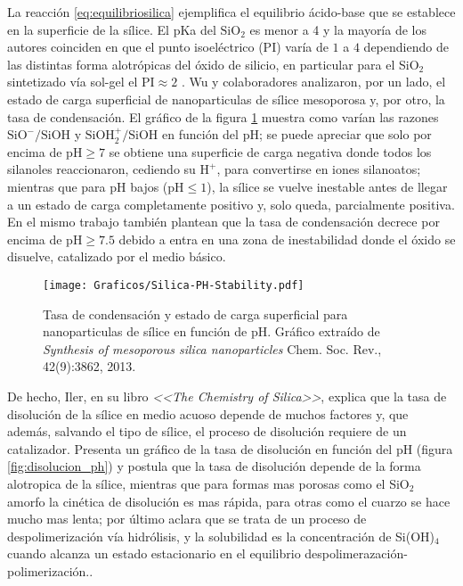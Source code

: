 	La reacción \ref{eq:equilibriosilica} ejemplifica el equilibrio ácido-base que se establece en la superficie de la sílice. El pKa del $\text{SiO}_2$ es menor a 4 y la mayoría de los autores coinciden en que el punto isoeléctrico (PI) varía de $1$ a $4$ dependiendo de  las distintas forma alotrópicas del óxido de silicio, en particular para el SiO$_2$ sintetizado vía sol-gel el $\text{PI}\approx 2$ \cite{Kosmulski2002,Kosmulski2014,Schwarz1984,Si-HanWu2013}.
	Wu y colaboradores\cite{Si-HanWu2013} analizaron, por un lado, el estado de carga superficial de nanoparticulas de sílice mesoporosa y, por otro, la tasa de condensación. El gráfico de la figura \ref{fig:silica_ph} muestra como varían las razones  $\text{SiO}^{-}/\text{SiOH}$ y $\text{SiOH}_2^{+}/\text{SiOH}$ en función del pH; se puede apreciar que solo por encima de $\text{pH}\geq7$ se obtiene una superficie de carga negativa donde todos los silanoles reaccionaron, cediendo su $\text{H}^{+}$, para convertirse en iones silanoatos; mientras que para pH bajos ($\text{pH}\leq1$), la sílice se vuelve inestable antes de llegar a un estado de carga completamente positivo y, solo queda, parcialmente positiva. En el mismo trabajo\cite{Si-HanWu2013} también plantean que la tasa de condensación decrece por encima de $\text{pH}\geq7.5$ debido a entra en una zona de inestabilidad donde el óxido se disuelve, catalizado por el medio básico.
			\begin{figure}[th!]
			\centering
 	       	\texttt{[image: Graficos/Silica-PH-Stability.pdf]}
	       		\caption[Tasa de condensación y estado de carga superficial]{Tasa de condensación y estado de carga superficial para nanoparticulas de sílice en función de pH. Gráfico extraído de \textit{Synthesis of mesoporous silica nanoparticles} Chem. Soc. Rev., 42(9):3862, 2013.\cite{Si-HanWu2013}}
	         	\label{fig:silica_ph}
	     		\end{figure}
			
	De hecho, Iler, en su libro \textit{<<The Chemistry of Silica>>}, explica que la tasa de disolución de la sílice en medio acuoso depende de muchos factores y, que además, salvando el tipo de sílice, el proceso de disolución requiere de un catalizador. Presenta un gráfico de la tasa de disolución en función del pH (figura \ref{fig:disolucion_ph}) y postula que la tasa de disolución depende de la forma alotropica de la sílice, mientras que para formas mas porosas como el SiO$_2$ amorfo la cinética de disolución es mas rápida, para otras como el cuarzo se hace mucho mas lenta; por último aclara que se trata de un proceso de despolimerización vía hidrólisis, y la solubilidad es la concentración de Si(OH)$_4$ cuando alcanza un estado estacionario en el equilibrio despolimerazación-polimerización.\cite{iler1979}. 

